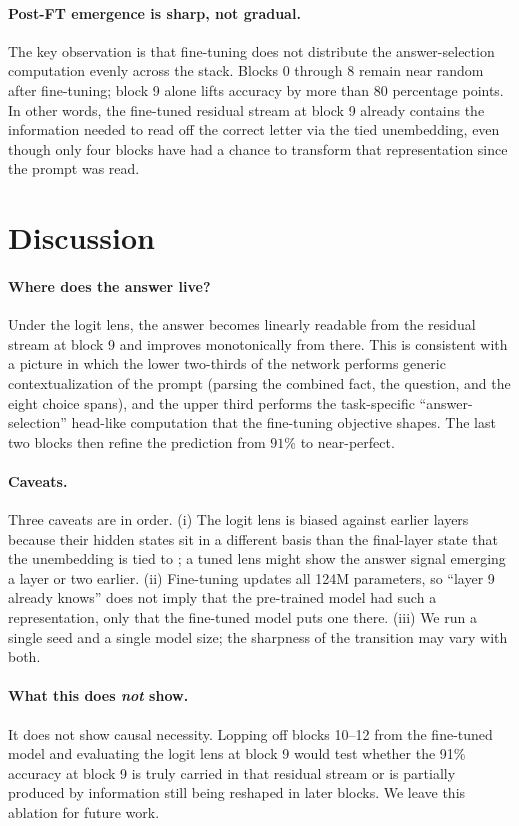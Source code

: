 \documentclass[11pt]{article}
\begin{document}
\paragraph{Post-FT emergence is sharp, not gradual.} The key observation is
that fine-tuning does not distribute the answer-selection computation evenly
across the stack. Blocks 0 through 8 remain near random after fine-tuning;
block 9 alone lifts accuracy by more than 80 percentage points. In other
words, the fine-tuned residual stream at block 9 already contains the
information needed to read off the correct letter via the tied unembedding,
even though only four blocks have had a chance to transform that representation
since the prompt was read.

\section{Discussion}

\paragraph{Where does the answer live?} Under the logit lens, the answer
becomes linearly readable from the residual stream at block 9 and improves
monotonically from there. This is consistent with a picture in which the
lower two-thirds of the network performs generic contextualization of the
prompt (parsing the combined fact, the question, and the eight choice spans),
and the upper third performs the task-specific ``answer-selection'' head-like
computation that the fine-tuning objective shapes. The last two blocks then
refine the prediction from $91\%$ to near-perfect.

\paragraph{Caveats.} Three caveats are in order. (i) The logit lens is biased
against earlier layers because their hidden states sit in a different basis
than the final-layer state that the unembedding is tied to
\citep{belrose2023tunedlens}; a tuned lens might show the answer signal
emerging a layer or two earlier. (ii) Fine-tuning updates all 124M parameters,
so ``layer 9 already knows'' does not imply that the pre-trained model had
such a representation, only that the fine-tuned model puts one there. (iii)
We run a single seed and a single model size; the sharpness of the transition
may vary with both.

\paragraph{What this does \emph{not} show.} It does not show causal
necessity. Lopping off blocks 10--12 from the fine-tuned model and evaluating
the logit lens at block 9 would test whether the 91\% accuracy at block 9 is
truly carried in that residual stream or is partially produced by information
still being reshaped in later blocks. We leave this ablation for future work.
\end{document}
